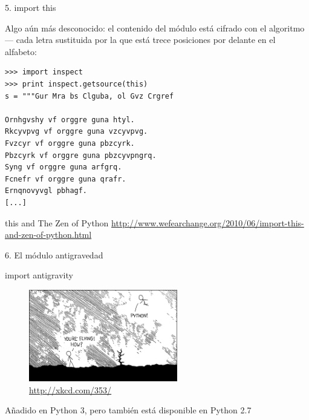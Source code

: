 \documentclass[14pt]{beamer}
\begin{document}
\begin{frame}[fragile]{5. import this}
  \small
  \begin{center}
    Algo aún más desconocido: el contenido del módulo
     está cifrado con el algoritmo
     --- cada letra sustituida por la que está trece
    posiciones por delante en el alfabeto:
  \end{center}

  \begin{exampleblock}{}
    \tiny
    \begin{lstlisting}
>>> import inspect
>>> print inspect.getsource(this)
s = """Gur Mra bs Clguba, ol Gvz Crgref

Ornhgvshy vf orggre guna htyl.
Rkcyvpvg vf orggre guna vzcyvpvg.
Fvzcyr vf orggre guna pbzcyrk.
Pbzcyrk vf orggre guna pbzcyvpngrq.
Syng vf orggre guna arfgrq.
Fcnefr vf orggre guna qrafr.
Ernqnovyvgl pbhagf.
[...]
    \end{lstlisting}
  \end{exampleblock}

  \scriptsize
  \begin{block}{\centering this and The Zen of Python}
    \centering
    \url{http://www.wefearchange.org/2010/06/import-this-and-zen-of-python.html}
  \end{block}
\end{frame}

\begin{frame}{6. El módulo antigravedad}
  \Large
  \begin{block}{}
    \centering import antigravity
  \end{block}{}

  \begin{figure}
    \centering
    \includegraphics[height=4cm]{pics/xkcd-353.png}
    \caption{\url{http://xkcd.com/353/}}
  \end{figure}

  \vspace{-0.75cm}

  \small
  \begin{alertblock}{}
    \centering
    Añadido en Python 3, pero también está disponible en Python 2.7
  \end{alertblock}
\end{frame}
\end{document}
